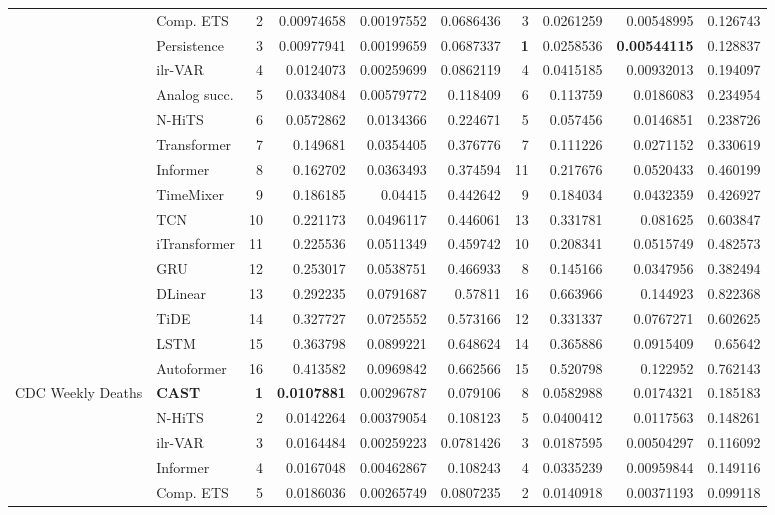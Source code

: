 \begin{longtable}{@{}llrrrrrrrr@{}}
 & Comp. ETS & 2 & 0.00974658 & 0.00197552 & 0.0686436 & 3 & 0.0261259 & 0.00548995 & 0.126743 \\
 & Persistence & 3 & 0.00977941 & 0.00199659 & 0.0687337 & \textbf{1} & 0.0258536 & \textbf{0.00544115} & 0.128837 \\
 & ilr-VAR & 4 & 0.0124073 & 0.00259699 & 0.0862119 & 4 & 0.0415185 & 0.00932013 & 0.194097 \\
 & Analog succ. & 5 & 0.0334084 & 0.00579772 & 0.118409 & 6 & 0.113759 & 0.0186083 & 0.234954 \\
 & N-HiTS & 6 & 0.0572862 & 0.0134366 & 0.224671 & 5 & 0.057456 & 0.0146851 & 0.238726 \\
 & Transformer & 7 & 0.149681 & 0.0354405 & 0.376776 & 7 & 0.111226 & 0.0271152 & 0.330619 \\
 & Informer & 8 & 0.162702 & 0.0363493 & 0.374594 & 11 & 0.217676 & 0.0520433 & 0.460199 \\
 & TimeMixer & 9 & 0.186185 & 0.04415 & 0.442642 & 9 & 0.184034 & 0.0432359 & 0.426927 \\
 & TCN & 10 & 0.221173 & 0.0496117 & 0.446061 & 13 & 0.331781 & 0.081625 & 0.603847 \\
 & iTransformer & 11 & 0.225536 & 0.0511349 & 0.459742 & 10 & 0.208341 & 0.0515749 & 0.482573 \\
 & GRU & 12 & 0.253017 & 0.0538751 & 0.466933 & 8 & 0.145166 & 0.0347956 & 0.382494 \\
 & DLinear & 13 & 0.292235 & 0.0791687 & 0.57811 & 16 & 0.663966 & 0.144923 & 0.822368 \\
 & TiDE & 14 & 0.327727 & 0.0725552 & 0.573166 & 12 & 0.331337 & 0.0767271 & 0.602625 \\
 & LSTM & 15 & 0.363798 & 0.0899221 & 0.648624 & 14 & 0.365886 & 0.0915409 & 0.65642 \\
 & Autoformer & 16 & 0.413582 & 0.0969842 & 0.662566 & 15 & 0.520798 & 0.122952 & 0.762143 \\
\addlinespace
CDC Weekly Deaths & \textbf{CAST} & \textbf{1} & \textbf{0.0107881} & 0.00296787 & 0.079106 & 8 & 0.0582988 & 0.0174321 & 0.185183 \\
 & N-HiTS & 2 & 0.0142264 & 0.00379054 & 0.108123 & 5 & 0.0400412 & 0.0117563 & 0.148261 \\
 & ilr-VAR & 3 & 0.0164484 & 0.00259223 & 0.0781426 & 3 & 0.0187595 & 0.00504297 & 0.116092 \\
 & Informer & 4 & 0.0167048 & 0.00462867 & 0.108243 & 4 & 0.0335239 & 0.00959844 & 0.149116 \\
 & Comp. ETS & 5 & 0.0186036 & 0.00265749 & 0.0807235 & 2 & 0.0140918 & 0.00371193 & 0.099118 \\

\end{longtable}
